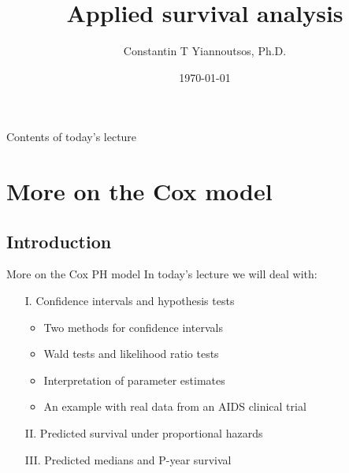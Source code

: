 \documentclass[envcountsect, 10pt, portrait, palatino]{beamer}
\title[]{Applied survival analysis}
\author[Constantin T Yiannoutsos]
{ Constantin T Yiannoutsos, Ph.D.}
\date[]{\today}
\begin{document}
\begin{frame}
  \titlepage
\end{frame}
\begin{frame}{Contents of today's lecture}
  \tableofcontents
\end{frame}
\section{More on the Cox model}
\subsection{Introduction}
\begin{frame}{More on the Cox PH model}
In today's lecture we will deal with:
\begin{itemize}
\item[I.] Confidence intervals and hypothesis tests
\begin{itemize}
\item Two methods for confidence intervals
\vspace{0.2in}
\item Wald tests and likelihood ratio tests
\vspace{0.2in}
\item Interpretation of parameter estimates
\vspace{0.2in}
\item An example with real data from an AIDS clinical trial
\end{itemize}
\item[II.] Predicted survival under proportional hazards
\item[III.] Predicted medians and P-year survival
\end{itemize}
\end{frame}
\end{document}
